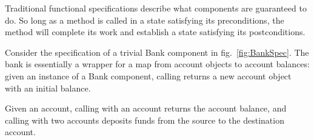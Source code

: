 Traditional functional specifications describe what components are
guaranteed to do. So long as a method is called in a state satisfying
its preconditions, the method will complete its work and establish a
state satisfying its postconditions.  


Consider the specification of a trivial Bank component in
fig.~\ref{fig:BankSpec}.  The bank is essentially a wrapper for a map
from account objects to account balances: given an instance of a Bank
component, calling  returns a new account object with
an initial balance. 
{}

Given an account, calling  with an
account returns the account balance, and calling  with
two accounts deposits funds from the source to the destination account.

